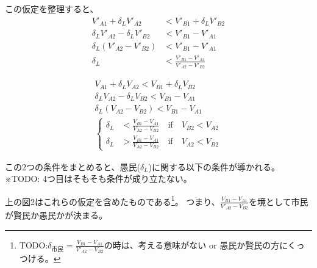 \documentclass[main.tex]{subfiles}
\begin{document}
この仮定を整理すると、
\begin{align*}
  V'_{A1} + \delta_L V'_{A2} &< V'_{B1} + \delta_L V'_{B2} \\
  \delta_L V'_{A2} - \delta_L V'_{B2} &< V'_{B1}  - V'_{A1} \\
  \delta_L (V'_{A2} - V'_{B2}) &< V'_{B1}  - V'_{A1}\\
  \delta_L &< \frac{V'_{B1}  - V'_{A1}}{V'_{A2} - V'_{B2}}
\end{align*}


\begin{align*}
  V_{A1} + \delta_L V_{A2} < V_{B1} + \delta_L V_{B2} \\
  \delta_L V_{A2} - \delta_L V_{B2} < V_{B1} - V_{A1} \\
  \delta_L (V_{A2} - V_{B2}) < V_{B1} - V_{A1} \\
  \begin{cases}
    \delta_L &< \frac{V_{B1}-V_{A1}}{V_{A2} - V_{B2}} \quad\text{if}\quad V_{B2} < V_{A2}\\
    \delta_L &> \frac{V_{B1}-V_{A1}}{V_{A2} - V_{B2}} \quad\text{if}\quad V_{A2} < V_{B2}
  \end{cases}
\end{align*}


この2つの条件をまとめると、愚民($\delta_L$)に関する以下の条件が導かれる。
※TODO: 4つ目はそもそも条件が成り立たない。



\bigskip
上の図2はこれらの仮定を含めたものである\footnote{TODO:$\delta_{市民} = \frac{V_{B1} - V_{A1}}{V'_{A2} - V_{B2}}$の時は、考える意味がない or 愚民か賢民の方にくっつける。}。
つまり、$\frac{V_{B1} - V_{A1}}{V'_{A2} - V_{B2}}$を境として市民が賢民か愚民かが決まる。 






\theendnotes
\end{document}
